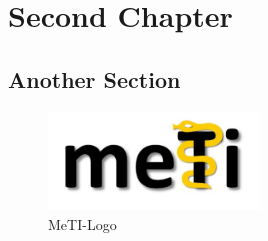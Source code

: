 \chapter{Second Chapter}

\section{Another Section}

\begin{figure}[h]
\centering
\includegraphics[width=0.5\textwidth]{HSRTReport/Assets/Images/METI.png}
\caption{MeTI-Logo}
\label{fig:meti}
\end{figure}



